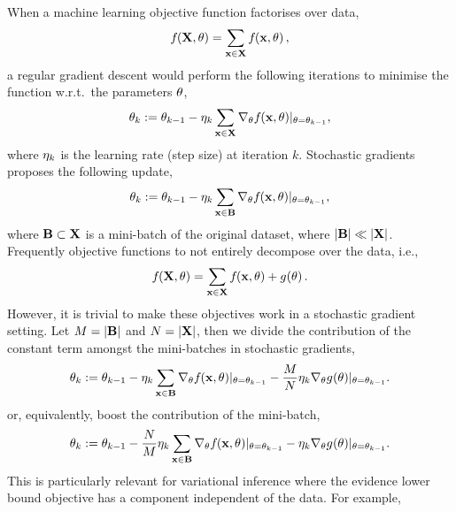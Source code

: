 \documentclass[11pt, oneside]{article}
\begin{document}
When a machine learning objective function factorises over data,
\begin{equation}
    {f}_{}\!\left({{\mathbf{X}, \theta}}\right) = \sum_{\mathbf{x} \in \mathbf{X}} {f}_{}\!\left({{\mathbf{x}, \theta}}\right),
\end{equation}
a regular gradient descent would perform the following iterations to minimise
the function w.r.t.\ the parameters $\theta$,
\begin{equation}
    \theta_k := \theta_{k-1} - \eta_k \sum_{\mathbf{x} \in \mathbf{X}}
    \nabla_{\theta} {f}_{}\!\left({{\mathbf{x}, \theta}}\right)\!|_{\theta = \theta_{k-1}},
\end{equation}
where $\eta_k$ is the learning rate (step size) at iteration $k$. Stochastic
gradients proposes the following update,
\begin{equation}
    \theta_k := \theta_{k-1} - \eta_k \sum_{\mathbf{x} \in \mathbf{B}}
    \nabla_{\theta} {f}_{}\!\left({{\mathbf{x}, \theta}}\right)\!|_{\theta = \theta_{k-1}},
    \label{eq:sg}
\end{equation}
where $\mathbf{B} \subset \mathbf{X}$ is a mini-batch of the original dataset, where
$|\mathbf{B}| \ll |\mathbf{X}|$.
Frequently objective functions to not entirely decompose over the data, i.e.,
\begin{equation}
    {f}_{}\!\left({{\mathbf{X}, \theta}}\right) = \sum_{\mathbf{x} \in \mathbf{X}} {f}_{}\!\left({{\mathbf{x}, \theta}}\right)
    + {g}_{}\!\left({{\theta}}\right).
    \label{eq:objwconst}
\end{equation}
However, it is trivial to make these objectives work in a stochastic gradient
setting. Let $M = |\mathbf{B}|$ and $N = |\mathbf{X}|$, then we divide the
contribution of the constant term amongst the mini-batches in stochastic 
gradients,
\begin{equation}
    \theta_k := \theta_{k-1} - \eta_k \sum_{\mathbf{x} \in \mathbf{B}}
    \nabla_{\theta} {f}_{}\!\left({{\mathbf{x}, \theta}}\right)\!|_{\theta = \theta_{k-1}}
    - \frac{M}{N} \eta_k \nabla_{\theta} 
    {g}_{}\!\left({{\theta}}\right)\!|_{\theta = \theta_{k-1}}.
    \label{eq:wsg}
\end{equation} 
or, equivalently, boost the contribution of the mini-batch,
\begin{equation}
    \theta_k := \theta_{k-1} - \frac{N}{M} \eta_k \sum_{\mathbf{x} \in \mathbf{B}}
    \nabla_{\theta} {f}_{}\!\left({{\mathbf{x}, \theta}}\right)\!|_{\theta = \theta_{k-1}}
    - \eta_k \nabla_{\theta} 
    {g}_{}\!\left({{\theta}}\right)\!|_{\theta = \theta_{k-1}}.
    \label{eq:wsg2}
\end{equation} 
This is particularly relevant for variational inference where the evidence
lower bound objective has a component independent of the data. For example, 
\end{document}

